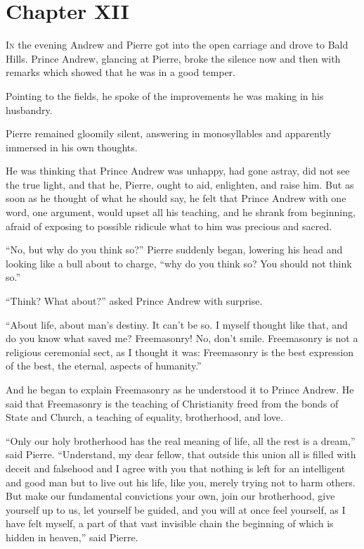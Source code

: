 \chapter*{Chapter XII}
\ifaudio     
{} 
\fi

\lettrine[lines=2, loversize=0.3, lraise=0]{\initfamily I}{n} the evening Andrew and Pierre got into the open carriage and
drove to Bald Hills. Prince Andrew, glancing at Pierre, broke the
silence now and then with remarks which showed that he was in a
good temper.

Pointing to the fields, he spoke of the improvements he was
making in his husbandry.

Pierre remained gloomily silent, answering in monosyllables and
apparently immersed in his own thoughts.

He was thinking that Prince Andrew was unhappy, had gone astray,
did not see the true light, and that he, Pierre, ought to aid,
enlighten, and raise him. But as soon as he thought of what he
should say, he felt that Prince Andrew with one word, one
argument, would upset all his teaching, and he shrank from
beginning, afraid of exposing to possible ridicule what to him
was precious and sacred.

``No, but why do you think so?'' Pierre suddenly began, lowering
his head and looking like a bull about to charge, ``why do you
think so? You should not think so.''

``Think? What about?'' asked Prince Andrew with surprise.

``About life, about man's destiny. It can't be so. I myself
thought like that, and do you know what saved me? Freemasonry!
No, don't smile.  Freemasonry is not a religious ceremonial sect,
as I thought it was: Freemasonry is the best expression of the
best, the eternal, aspects of humanity.''

And he began to explain Freemasonry as he understood it to Prince
Andrew. He said that Freemasonry is the teaching of Christianity
freed from the bonds of State and Church, a teaching of equality,
brotherhood, and love.

``Only our holy brotherhood has the real meaning of life, all the
rest is a dream,'' said Pierre. ``Understand, my dear fellow,
that outside this union all is filled with deceit and falsehood
and I agree with you that nothing is left for an intelligent and
good man but to live out his life, like you, merely trying not to
harm others. But make our fundamental convictions your own, join
our brotherhood, give yourself up to us, let yourself be guided,
and you will at once feel yourself, as I have felt myself, a part
of that vast invisible chain the beginning of which is hidden in
heaven,'' said Pierre.

